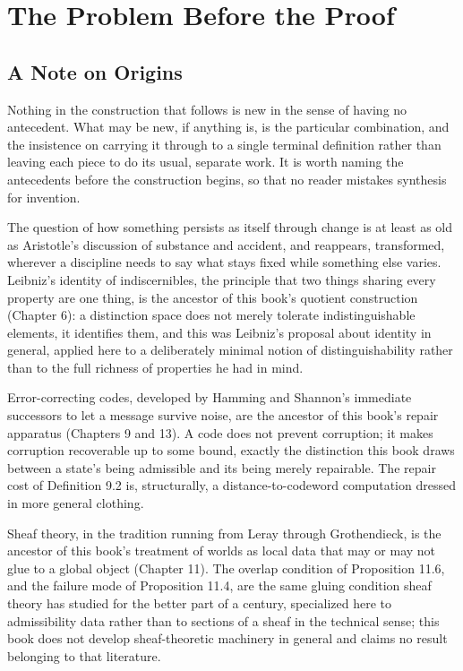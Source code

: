 \documentclass[11pt]{book}
\begin{document}
\part{The Problem Before the Proof}

\chapter*{A Note on Origins}

Nothing in the construction that follows is new in the sense of having no antecedent. What may be new, if anything is, is the particular combination, and the insistence on carrying it through to a single terminal definition rather than leaving each piece to do its usual, separate work. It is worth naming the antecedents before the construction begins, so that no reader mistakes synthesis for invention.

The question of how something persists as itself through change is at least as old as Aristotle's discussion of substance and accident, and reappears, transformed, wherever a discipline needs to say what stays fixed while something else varies. Leibniz's identity of indiscernibles, the principle that two things sharing every property are one thing, is the ancestor of this book's quotient construction (Chapter 6): a distinction space does not merely tolerate indistinguishable elements, it identifies them, and this was Leibniz's proposal about identity in general, applied here to a deliberately minimal notion of distinguishability rather than to the full richness of properties he had in mind.

Error-correcting codes, developed by Hamming and Shannon's immediate successors to let a message survive noise, are the ancestor of this book's repair apparatus (Chapters 9 and 13). A code does not prevent corruption; it makes corruption recoverable up to some bound, exactly the distinction this book draws between a state's being admissible and its being merely repairable. The repair cost of Definition 9.2 is, structurally, a distance-to-codeword computation dressed in more general clothing.

Sheaf theory, in the tradition running from Leray through Grothendieck, is the ancestor of this book's treatment of worlds as local data that may or may not glue to a global object (Chapter 11). The overlap condition of Proposition 11.6, and the failure mode of Proposition 11.4, are the same gluing condition sheaf theory has studied for the better part of a century, specialized here to admissibility data rather than to sections of a sheaf in the technical sense; this book does not develop sheaf-theoretic machinery in general and claims no result belonging to that literature.
\end{document}
